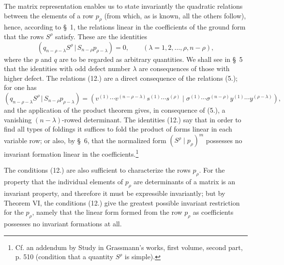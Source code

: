 \documentclass[11pt]{article}
\providecommand{\pair}[2]{(#1\,|\,#2)}
\begin{document}
The matrix representation enables us to state invariantly the quadratic relations between the elements of a row $p_\rho$ (from which, as is known, all the others follow), hence, according to \S\ 1, the relations linear in the coefficients of the ground form that the rows $S^\rho$ satisfy. These are the identities
\begin{equation}
 \pair{q_{n-\rho-\lambda}S^\rho}{S_{n-\rho}p_{\rho-\lambda}}=0,
 \qquad (\lambda=1,2,\ldots,\rho,n-\rho),
\tag{12}
\end{equation}
where the $p$ and $q$ are to be regarded as arbitrary quantities. We shall see in \S\ 5 that the identities with odd defect number $\lambda$ are consequences of those with higher defect. The relations (12.) are a direct consequence of the relations (5.); for one has
\[
 \pair{q_{n-\rho-\lambda}S^\rho}{S_{n-\rho}p_{\rho-\lambda}}
 =(v^{(1)}\cdots v^{(n-\rho-\lambda)}s^{(1)}\cdots s^{(\rho)}\mid \sigma^{(1)}\cdots\sigma^{(n-\rho)}y^{(1)}\cdots y^{(\rho-\lambda)}),
\]
and the application of the product theorem gives, in consequence of (5.), a vanishing $(n-\lambda)$-rowed determinant. The identities (12.) say that in order to find all types of foldings it suffices to fold the product of forms linear in each variable row; or also, by \S\ 6, that the normalized form $(S^\rho\mid p_\rho)^m$ possesses no invariant formation linear in the coefficients.\footnote{Cf. an addendum by Study in Grassmann's works, first volume, second part, p. 510 (condition that a quantity $S^\rho$ is simple).}

The conditions (12.) are also sufficient to characterize the rows $p_\rho$. For the property that the individual elements of $p_\rho$ are determinants of a matrix is an invariant property, and therefore it must be expressible invariantly; but by Theorem VI, the conditions (12.) give the greatest possible invariant restriction for the $p_\rho$, namely that the linear form formed from the row $p_\rho$ as coefficients possesses no invariant formations at all.
\end{document}
